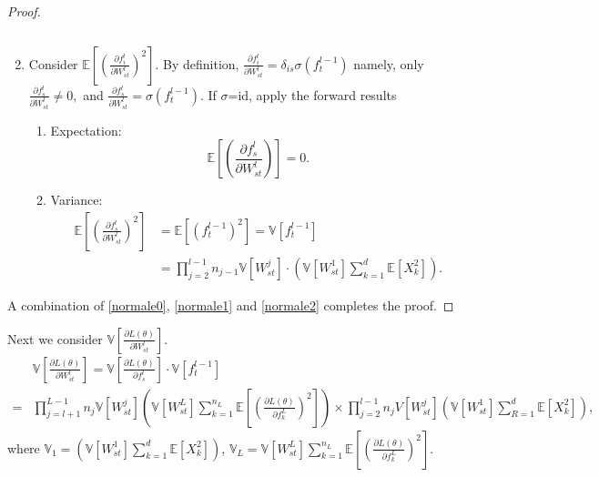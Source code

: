 \begin{proof}
\begin{enumerate}
\begin{equation}
	\end{equation}
    \item Consider $ \mathbb{E}\left[\left(\frac{\partial f_{i}^{l}}{\partial W_{s t}^{l}}\right)^{2}\right]
    $. By definition, 
    $
    \frac{\partial f_{i}^{l}}{\partial W_{s t}^{l}}=\delta_{i s} \sigma\left(f_{t}^{l-1}\right)
    $
    namely, only
	$
	\frac{\partial f_{s}^{l}}{\partial W_{s t}^{l}} \not = 0,
	$
	and $\frac{\partial f_{s}^{l}}{\partial W_{s t}^{l}} = \sigma\left(f^{l-1}_{t}\right)$. If $ \sigma $=id, apply the forward results
		\begin{enumerate}
		\item Expectation: 
		$$
		\mathbb{E}\left[\left(\frac{\partial f_{s}^{l}}{\partial W_{s t}^{l}}\right)\right]=0.
		$$
		\item Variance:
		\begin{equation}\label{normale2}
		\begin{split}
		\mathbb{E}\left[\left(\frac{\partial f_{s}^{l}}{\partial W_{s t}^{l}}\right)^{2}\right]& =\mathbb{E}\left[\left(f_{t}^{l-1}\right)^{2}\right]=\mathbb{V}\left[ f_{t}^{l-1}\right]
		\\
		&=\prod\limits_{j=2}^{l-1} n_{j-1} \mathbb{V}\left[W_{s t}^{j}\right] \cdot\left(\mathbb{V}\left[W_{s t}^{1}\right] \sum\limits_{k=1}^{d} \mathbb{E}\left[X_k^{2}\right]\right).
		\end{split}
		\end{equation}
		\end{enumerate} 
\end{enumerate}
A combination of \eqref{normale0}, \eqref{normale1} and \eqref{normale2} completes the proof.
\end{proof}

Next we consider $ \mathbb{V}\left[\frac{\partial L(\theta)}{\partial W^{l} _{st}}\right] $.
	\begin{equation*}
	\begin{split} 
	&\mathbb{V}\left[\frac{\partial L(\theta)}{\partial W^{l} _{st}}\right] =\mathbb{V}\left[\frac{\partial L (\theta)}{\partial f_{s}^{l}}\right] \cdot \mathbb{V}\left[f^{l-1}_{t}\right] 
	\\
	 =& \prod\limits_{j=l+1}^{L-1} n_{j} \mathbb{V}\left[W_{s t}^{j}\right] \left(\mathbb{V}\left[W_{s t}^{L}\right]\sum\limits_{k=1}^{n_{L}} \mathbb{E}\left[\left(\frac{\partial L(\theta)}{\partial f_{k}^{L}}\right)^{2}\right]\right) \times \prod\limits_{j=2}^{l-1} n_{j} V\left[W_{s t}^{j}\right] \left(\mathbb{V}\left[W_{s t}^{1}\right]\sum\limits_{R=1}^{d} \mathbb{E}\left[ X_{k}^{2}\right]\right),
	\end{split}
	\end{equation*}
	where $ \mathbb{V}_{1}=\left(\mathbb{V}\left[W_{s t}^{1}\right]\sum\limits_{k=1}^{d} \mathbb{E}\left[ X_{k}^{2}\right]\right)	$,
$  \mathbb{V}_{L}=\mathbb{V}\left[W_{s t}^{L}\right]\sum\limits_{k=1}^{n_{L}} \mathbb{E}\left[ (\frac{\partial L(\theta)}{\partial f_{k}^{L}})^{2}\right]$.


